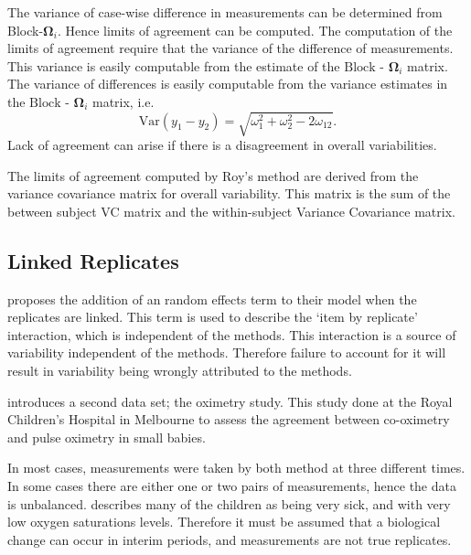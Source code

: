 \documentclass[12pt, a4paper]{report}
\theoremstyle{plain}
\theoremstyle{definition}
\theoremstyle{remark}
\begin{document}
The variance of case-wise difference in measurements can be determined from Block-$\boldsymbol{\Omega}_{i}$. Hence limits of agreement can be computed. The computation of the limits of agreement require that the variance of the difference of measurements. This variance is easily computable from the estimate of the ${\mbox{Block - }\boldsymbol \Omega_{i}}$ matrix.
The variance of differences is easily computable from the variance estimates in the ${\mbox{Block - }\boldsymbol \Omega_{i}}$ matrix, i.e.
\[
\mathrm{Var}(y_1 - y_2) = \sqrt{ \omega^2_1 + \omega^2_2 - 2\omega_{12}}.
\]	
Lack of agreement can arise if there is a disagreement in overall variabilities. 

The limits of agreement computed by Roy's method are derived from the variance covariance matrix for overall variability.
This matrix is the sum of the between subject VC matrix and the within-subject Variance Covariance matrix.


%







\subsection{Linked Replicates}


\citet{BXC2008} proposes the addition of an random effects term to their model when the replicates are linked. This term is used to describe the `item by replicate' interaction, which is independent of the methods. This interaction is a source of variability independent of the methods. Therefore failure to account for it will result in variability being wrongly attributed to the methods.

\citet{BXC2008} introduces a second data set; the oximetry study. This study done at the Royal Children's Hospital in
Melbourne to assess the agreement between co-oximetry and pulse oximetry in small babies.

In most cases, measurements were taken by both method at three different times. In some cases there are either one or two pairs of measurements, hence the data is unbalanced. \citet{BXC2008} describes many of the children as being very sick, and with very low oxygen saturations levels. Therefore it must be assumed that a biological change can occur in interim periods, and measurements are not true replicates.
\end{document}
